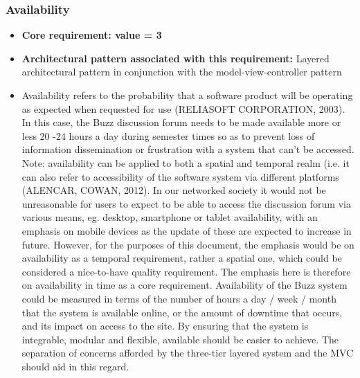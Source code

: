 \documentclass[a4paper]{article}
\begin{document}
\subsubsection{Availability}
\begin{itemize}
	\item \textbf{Core requirement: value = 3}
	\item \textbf{Architectural pattern associated with this requirement:} Layered architectural pattern in conjunction with the model-view-controller pattern 
	\item Availability refers to the probability that a software product will be operating as expected when requested for use (RELIASOFT CORPORATION, 2003). In this case, the Buzz discussion forum needs to be made available more or less 20 -24 hours a day during semester times so as to prevent loss of information dissemination or frustration with a system that can’t be accessed. Note: availability can be applied to both a spatial and temporal realm (i.e. it can also refer to accessibility of the software system via different platforms (ALENCAR, COWAN, 2012). In our networked society it would not be unreasonable for users to expect to be able to access the discussion forum via various means, eg. desktop, smartphone or tablet availability, with an emphasis on mobile devices as the update of these are expected to increase in future. However, for the purposes of this document, the emphasis would be on availability as a temporal requirement, rather a spatial one, which could be considered a nice-to-have quality requirement. The emphasis here is therefore on availability in time as a core requirement. Availability of the Buzz system could be measured in terms of the number of hours a day / week / month that the system is available online, or the amount of downtime that occurs, and its impact on access to the site. By ensuring that the system is integrable, modular and flexible, available should be easier to achieve. The separation of concerns  afforded by the three-tier layered system and the MVC should aid in this regard. 
\end{itemize}
\end{document}
